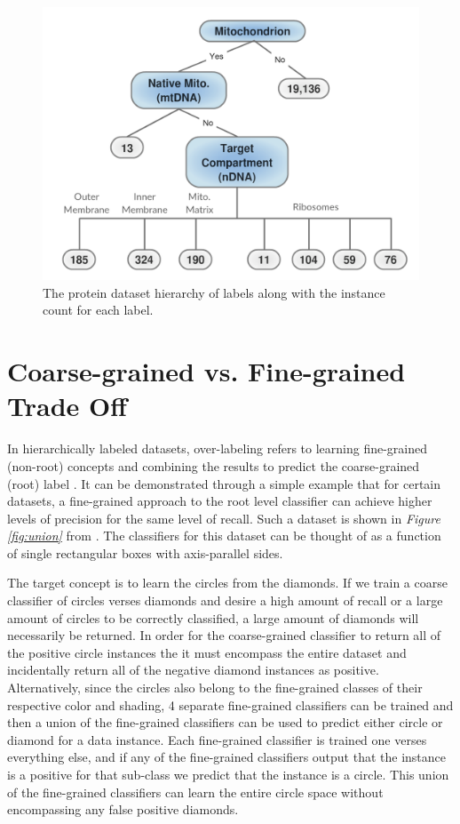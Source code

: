 \documentclass[ms]{nuthesis}
\begin{document}
\FloatBarrier
\begin{figure}[!htb]
	\centering
\includegraphics[width=0.75\columnwidth]{fig/MitoTreeLabels}
    \caption{The protein dataset hierarchy of labels along with the instance
    count for each label.}
    \label{fig:Mitotree}
\end{figure}
\FloatBarrier


\section{Coarse-grained vs. Fine-grained Trade Off}
\par In hierarchically labeled datasets, over-labeling refers to learning fine-grained
(non-root) concepts and combining the results to predict the coarse-grained (root) label \cite{yugi}.
It can be demonstrated through a simple example
that for certain datasets, a fine-grained approach to the root level classifier can achieve higher
levels of precision for the same level of recall. Such a dataset is shown in \textit{Figure
\ref{fig:union}} from \cite{yugi}. The classifiers for this dataset can be thought of as a
function of single rectangular boxes with axis-parallel sides.

\par The target concept is to learn the circles from the diamonds. If we train a coarse classifier
of circles verses diamonds and desire a high amount of recall or a large amount of circles to be
correctly classified, a large amount of diamonds will
necessarily be returned. In order for the coarse-grained classifier to return all of the positive
circle instances the it must encompass the entire dataset
and incidentally return all of the negative diamond instances as
positive. Alternatively, since the circles also belong to the
fine-grained classes of their respective color and shading, 4 separate fine-grained classifiers
can be trained and then a union of the fine-grained classifiers can be used to predict either
circle or diamond for a data instance. Each fine-grained classifier is trained one verses everything
else, and if any of the fine-grained classifiers output that the instance is a positive for that
sub-class we predict that the instance is a circle. This union of the fine-grained classifiers
can learn the entire circle space without encompassing any false positive diamonds.
\end{document}
